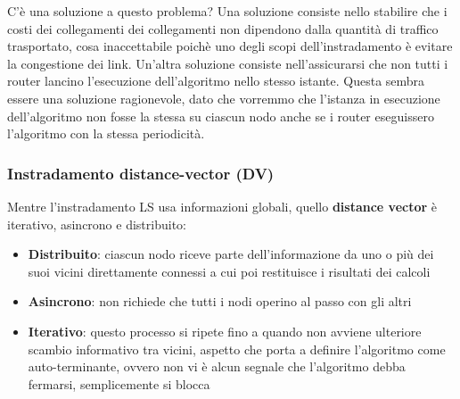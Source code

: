 \documentclass[11pt,a4paper]{article}
\begin{document}
C'è una soluzione a questo problema? Una soluzione consiste nello stabilire che i costi dei collegamenti dei collegamenti non dipendono dalla quantità di traffico trasportato, cosa inaccettabile poichè uno degli scopi dell'instradamento è evitare la congestione dei link. Un'altra soluzione consiste nell'assicurarsi che non tutti i router lancino l'esecuzione dell'algoritmo nello stesso istante. Questa sembra essere una soluzione ragionevole, dato che vorremmo che l'istanza in esecuzione dell'algoritmo non fosse la stessa su ciascun nodo anche se i router eseguissero l'algoritmo con la stessa periodicità.

\subsubsection{Instradamento distance-vector (DV)}
Mentre l'instradamento LS usa informazioni globali, quello \textbf{distance vector} è iterativo, asincrono e distribuito:
\begin{itemize}
	\item \textbf{Distribuito}: ciascun nodo riceve parte dell'informazione da uno o più dei suoi vicini direttamente connessi a cui poi restituisce i risultati dei calcoli
	\item \textbf{Asincrono}: non richiede che tutti i nodi operino al passo con gli altri
	\item \textbf{Iterativo}: questo processo si ripete fino a quando non avviene ulteriore scambio informativo tra vicini, aspetto che porta a definire l'algoritmo come auto-terminante, ovvero non vi è alcun segnale che l'algoritmo debba fermarsi, semplicemente si blocca
\end{itemize}
\end{document}
